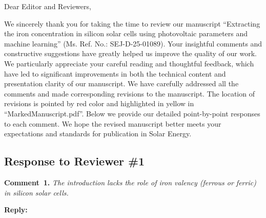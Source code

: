 \documentclass[a4paper,fleqn]{cas-sc}
\begin{document}
\shorttitle{}



Dear Editor and Reviewers,

We sincerely thank you for taking the time to review our manuscript
``Extracting the iron concentration in silicon solar cells using photovoltaic parameters and machine learning''
(Ms. Ref. No.: SEJ-D-25-01089).
Your insightful comments and constructive suggestions have greatly helped us improve
the quality of our work.
We particularly appreciate your careful reading and thoughtful feedback,
which have led to significant improvements in both the technical content and presentation clarity of our manuscript.
We have carefully addressed all the comments and made corresponding revisions to the manuscript.
The location of revisions is pointed by red color and highlighted in yellow in ``MarkedManuscript.pdf''.
Below we provide our detailed point-by-point responses to each comment.
We hope the revised manuscript better meets your expectations and standards for publication in Solar Energy.

\subsection*{Response to Reviewer \#1 }

\noindent
\textcolor[rgb]{0.00,0.50,1.00}{\textbf{Comment~1.}}
\emph{The introduction lacks the role of iron valency (ferrous or ferric) in silicon solar cells.}

\noindent
\textcolor[rgb]{0.51,0.00,0.00}{\textbf{Reply:}}
\end{document}
